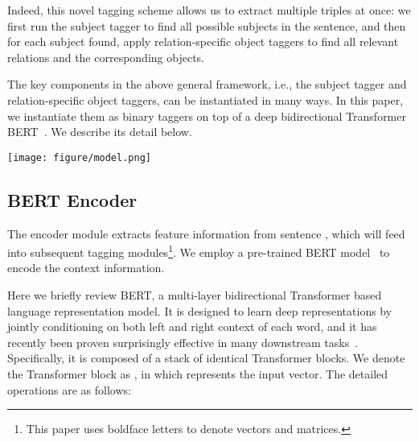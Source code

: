 \documentclass[11pt,a4paper]{article}
\begin{document}
\par Indeed, this novel tagging scheme allows us to extract multiple triples at once: we first run the subject tagger to find all possible subjects in the sentence, and then for each subject found, apply relation-specific object taggers to find all relevant relations and the corresponding objects.

\par The key components in the above general framework, i.e., the subject tagger and relation-specific object taggers, can be instantiated in many ways. In this paper, we instantiate them as binary taggers on top of a deep bidirectional Transformer BERT~\citep{devlin2019BERT}. We describe its detail below.

\begin{figure*} [!t]
		\centering
		\texttt{[image: figure/model.png]} 
		\caption{An overview of the proposed \textsc{CasRel} framework. In this example, there are three candidate subjects detected at the low level, while the presented 0/1 tags at high level are specific to the first subject \emph{Jackie R. Brown}, i.e., a snapshot of the iteration state when  is shown as above. For the subsequent iterations (), the results at high level will change, reflecting different triples detected. For instance, when , the high-level orange (green) blocks will change to 0 (1), respectively, reflecting the relational triple \emph{(Washington, Capital\_of, United States Of America)} led by the second candidate subject \emph{Washington}.}
		\label{fig:model}
	\end{figure*}


\subsection{BERT Encoder}
The encoder module extracts feature information   from sentence , which will feed into subsequent tagging modules\footnote{This paper uses boldface letters to denote vectors and matrices.}. We employ a pre-trained BERT model~\cite{devlin2019BERT} to encode the context information.

\par Here we briefly review BERT, a multi-layer bidirectional Transformer based language representation model. It is designed to learn deep representations by jointly conditioning on both left and right context of each word, and it has recently been proven surprisingly effective in many downstream tasks~\cite{zhong2019Knowledge}. Specifically, it is composed of a stack of  identical Transformer blocks. We denote the Transformer block as , in which  represents the input vector. The detailed operations are as follows:
\end{document}
